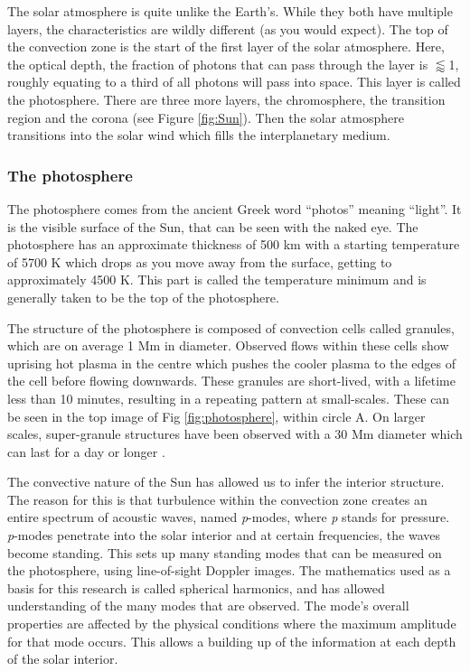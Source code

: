     The solar atmosphere is quite unlike the Earth's.
    While they both have multiple layers, the characteristics are wildly different (as you would expect). 
    The top of the convection zone is the start of the first layer of the solar atmosphere.
    Here, the optical depth, the fraction of photons that can pass through the layer is $\lessapprox$1, roughly equating to a third of all photons will pass into space.
    This layer is called the photosphere.
    There are three more layers, the chromosphere, the transition region and the corona (see Figure \ref{fig:Sun}).
    Then the solar atmosphere transitions into the solar wind which fills the interplanetary medium.
    
\subsubsection{The photosphere}

    The photosphere comes from the ancient Greek word ``photos'' meaning ``light''.
    It is the visible surface of the Sun, that can be seen with the naked eye.
    The photosphere has an approximate thickness of 500 km with a starting temperature of 5700 K which drops as you move away from the surface, getting to approximately 4500 K.
    This part is called the temperature minimum and is generally taken to be the top of the photosphere.

    The structure of the photosphere is composed of convection cells called granules, which are on average 1 Mm in diameter.
    Observed flows within these cells show uprising hot plasma in the centre which pushes the cooler plasma to the edges of the cell before flowing downwards. 
    These granules are short-lived, with a lifetime less than 10 minutes, resulting in a repeating pattern at small-scales.
    These can be seen in the top image of Fig \ref{fig:photosphere}, within circle A.
    On larger scales, super-granule structures have been observed with a 30 Mm diameter which can last for a day or longer \citep{lrsp-2010-2}.
    
    The convective nature of the Sun has allowed us to infer the interior structure. 
    The reason for this is that turbulence within the convection zone creates an entire spectrum of acoustic waves, named \textit{p}-modes, where \textit{p} stands for pressure.
    \textit{p}-modes penetrate into the solar interior and at certain frequencies, the waves become standing.
    This sets up many standing modes that can be measured on the photosphere, using line-of-sight Doppler images. 
    The mathematics used as a basis for this research is called spherical harmonics, and has allowed understanding of the many modes that are observed.
    The mode's overall properties are affected by the physical conditions where the maximum amplitude for that mode occurs. 
    This allows a building up of the information at each depth of the solar interior.
    
